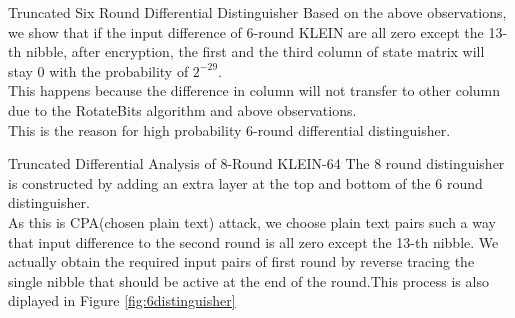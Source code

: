 \begin{frame}{Truncated Six Round Differential Distinguisher}
Based on the above observations, we show that if the input difference of 6-round KLEIN are all zero except the 13-th nibble, after encryption, the first and the third column of state matrix will stay 0 with the probability of $2^{-29}$.\\
This happens because the difference in column will not transfer to other column due to the RotateBits algorithm and above observations. \\ This is the reason for high probability 6-round differential distinguisher.
\end{frame}


\begin{frame}{Truncated Differential Analysis of 8-Round KLEIN-64}
The 8 round distinguisher is constructed by adding an extra layer at the top and bottom of the 6 round distinguisher.\\
As this is CPA(chosen plain text) attack, we choose plain text pairs such a way that input difference to the second round is all zero except the 13-th nibble. We actually obtain the required input pairs of first round by reverse tracing the single nibble that should be active at the end of the round.This process is also diplayed in Figure \ref{fig:6distinguisher} \\
\end{frame}

